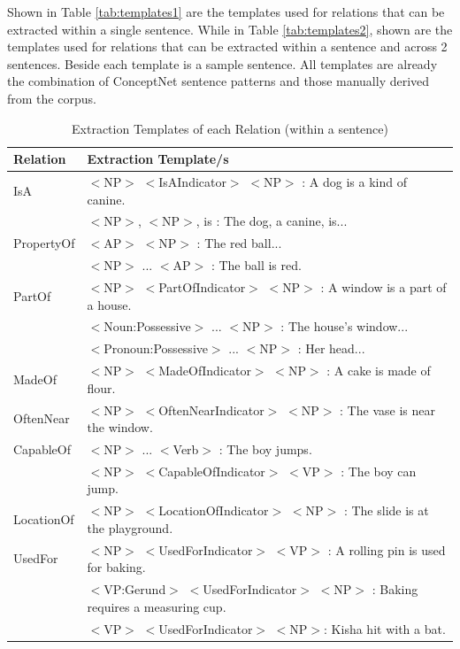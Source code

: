 Shown in Table \ref{tab:templates1} are the templates used for relations that can be extracted within a single sentence. While in Table \ref{tab:templates2}, shown are the templates used for relations that can be extracted within a sentence and across 2 sentences. Beside each template is a sample sentence. All templates are already the combination of ConceptNet sentence patterns and those manually derived from the corpus.

\begin{table}[H]   %
\centering
\caption{Extraction Templates of each Relation (within a sentence)} \vspace{0.25em}
\begin{tabular}{|p{3.5cm}|p{10cm}|} \hline
\textbf{Relation} & \textbf{Extraction Template/s} \\ \hline
IsA					& $<$NP$>$ $<$IsAIndicator$>$ $<$NP$>$ : A dog is a kind of canine. \\
					& $<$NP$>$, $<$NP$>$, is : The dog, a canine, is... \\ \hline
PropertyOf			& $<$AP$>$ $<$NP$>$ : The red ball... \\
					& $<$NP$>$ ... $<$AP$>$ : The ball is red. \\ \hline
PartOf				& $<$NP$>$ $<$PartOfIndicator$>$ $<$NP$>$ : A window is a part of a house. \\
					& $<$Noun:Possessive$>$ ... $<$NP$>$ : The house's window... \\
					& $<$Pronoun:Possessive$>$ ... $<$NP$>$ : Her head... \\ \hline
MadeOf				& $<$NP$>$ $<$MadeOfIndicator$>$ $<$NP$>$ : A cake is made of flour. \\ \hline
OftenNear			& $<$NP$>$ $<$OftenNearIndicator$>$ $<$NP$>$ : The vase is near the window. \\ \hline
CapableOf			& $<$NP$>$ ... $<$Verb$>$ : The boy jumps. \\
					& $<$NP$>$ $<$CapableOfIndicator$>$ $<$VP$>$ : The boy can jump. \\ \hline
LocationOf			& $<$NP$>$ $<$LocationOfIndicator$>$ $<$NP$>$ : The slide is at the playground. \\ \hline
UsedFor				& $<$NP$>$ $<$UsedForIndicator$>$ $<$VP$>$ : A rolling pin is used for baking. \\
					& $<$VP:Gerund$>$ $<$UsedForIndicator$>$ $<$NP$>$ : Baking requires a measuring cup. \\
					& $<$VP$>$ $<$UsedForIndicator$>$ $<$NP$>$: Kisha hit with a bat. \\ \hline

\end{tabular}
\end{table}

